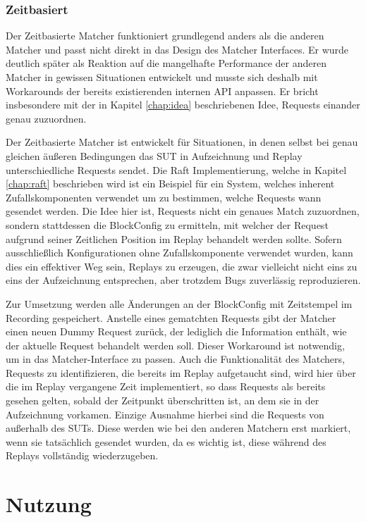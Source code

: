 \documentclass[12pt,a4paper]{report}
\begin{document}
\subsubsection{Zeitbasiert}
Der Zeitbasierte Matcher funktioniert grundlegend anders als die anderen Matcher und passt nicht direkt in das Design des Matcher
Interfaces. Er wurde deutlich später als Reaktion auf die mangelhafte Performance der anderen Matcher in gewissen Situationen
entwickelt und musste sich deshalb mit Workarounds der bereits existierenden internen API anpassen. Er bricht insbesondere mit der
in Kapitel \ref{chap:idea} beschriebenen Idee, Requests einander genau zuzuordnen.

Der Zeitbasierte Matcher ist entwickelt für Situationen, in denen selbst bei genau gleichen äußeren Bedingungen das SUT in
Aufzeichnung und Replay unterschiedliche Requests sendet. Die Raft Implementierung, welche in Kapitel \ref{chap:raft} beschrieben wird ist ein
Beispiel für ein System, welches inherent Zufallskomponenten verwendet um zu bestimmen, welche Requests wann gesendet werden.
Die Idee hier ist, Requests nicht ein genaues Match zuzuordnen, sondern stattdessen die BlockConfig zu ermitteln, mit welcher der
Request aufgrund seiner Zeitlichen Position im Replay behandelt werden sollte. Sofern ausschließlich Konfigurationen ohne
Zufallskomponente verwendet wurden, kann dies ein effektiver Weg sein, Replays zu erzeugen, die zwar vielleicht nicht eins zu eins der
Aufzeichnung entsprechen, aber trotzdem Bugs zuverlässig reproduzieren.

Zur Umsetzung werden alle Änderungen an der BlockConfig mit Zeitstempel im Recording gespeichert. Anstelle eines gematchten
Requests gibt der Matcher einen neuen Dummy Request zurück, der lediglich die Information enthält, wie der aktuelle Request
behandelt werden soll. Dieser Workaround ist notwendig, um in das Matcher-Interface zu passen. Auch die Funktionalität des
Matchers, Requests zu identifizieren, die bereits im Replay aufgetaucht sind, wird hier über die im Replay vergangene Zeit
implementiert, so dass Requests als bereits gesehen gelten, sobald der Zeitpunkt überschritten ist, an dem sie in der Aufzeichnung
vorkamen. Einzige Ausnahme hierbei sind die Requests von außerhalb des SUTs. Diese werden wie bei den anderen Matchern erst markiert,
wenn sie tatsächlich gesendet wurden, da es wichtig ist, diese während des Replays vollständig wiederzugeben.

\section{Nutzung}
\end{document}
